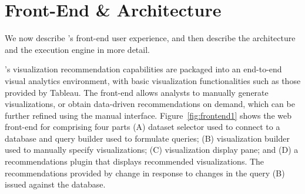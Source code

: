 
\section{{\large \SeeDB} Front-End \& Architecture}
\label{sec:system_architecture}


We now describe \SeeDB's front-end user experience, and then
describe the architecture and the execution engine in more detail.

\SeeDB's visualization recommendation capabilities
are packaged into an end-to-end visual analytics environment, 
with basic visualization functionalities such as those provided by Tableau.
The \SeeDB front-end allows analysts to manually
generate visualizations, or
obtain data-driven recommendations on demand, which can be further
refined using the manual interface.
Figure~\ref{fig:frontend1} shows the web front-end for \SeeDB 
comprising four parts 
(A) dataset selector used to connect to a database and query builder used to
formulate queries; 
(B) visualization builder used to manually specify visualizations; 
(C) visualization display pane; and 
(D) a recommendations plugin 
that displays recommended visualizations.
The recommendations provided by \SeeDB change in 
response to changes in the query (B)
issued against the database.

